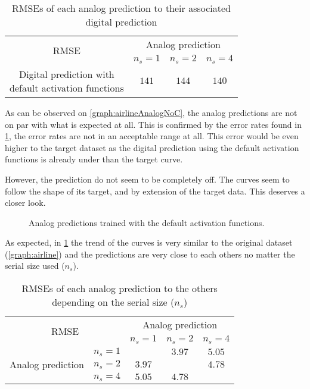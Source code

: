 \begin{table}[H]
  \centering
  \begin{tabular}{|c|c|c|c|}
    \hline
    \multirow{2}{*}{\acs{RMSE}} & \multicolumn{3}{c|}{Analog prediction}\\
    \cline{2-4}
    & $n_s=1$ & $n_s=2$ & $n_s=4$ \\
    \hline
    \specialcell{Digital prediction with\\default activation functions} & $141$ & $144$ & $140$\\
    \hline
  \end{tabular}
  \caption{\acp{RMSE} of each analog prediction to their associated digital prediction}
  \label{tab:airlineAnalogNoC}
\end{table}

As can be observed on \cref{graph:airlineAnalogNoC}, the analog predictions are not on par with what is expected at all. This is confirmed by the error rates found in \cref{tab:airlineAnalogNoC}, the error rates are not in an acceptable range at all. This error would be even higher to the target dataset as the digital prediction using the default activation functions is already under than the target curve.

However, the prediction do not seem to be completely off. The curves seem to follow the shape of its target, and by extension of the target data. This deserves a closer look.

\begin{figure}[H]
  \centering
  
  \caption{Analog predictions trained with the default activation functions.}
  \label{graph:airlineAnalogNoCZoomed}
\end{figure}

As expected, in \cref{graph:airlineAnalogNoCZoomed} the trend of the curves is very similar to the original dataset (\cref{graph:airline}) and the predictions are very close to each others no matter the serial size used ($n_s$).

\begin{table}[H]
  \centering
  \begin{tabular}{|c|c|c|c|c|}
    \hline
    \multicolumn{2}{|c}{\multirow{2}{*}{\ac{RMSE}}} & \multicolumn{3}{|c|}{Analog prediction}\\
    \cline{3-5}
    \multicolumn{2}{|c}{} & \multicolumn{1}{|c|}{$n_s=1$} & $n_s=2$ & $n_s=4$ \\
    \hline
    \multirow{3}{*}{Analog prediction} & $n_s=1$ &\cellcolor[HTML]{202020} & $3.97$ & $5.05$\\
    \cline{2-5}
    & $n_s=2$  & $3.97$ & \cellcolor[HTML]{202020} & $4.78$\\
    \cline{2-5}
    & $n_s=4$ & $5.05$ & $4.78$ & \cellcolor[HTML]{202020}\\
    \hline
  \end{tabular}
  \caption{\acp{RMSE} of each analog prediction to the others depending on the serial size ($n_s$)}
  \label{tab:airlineAnalogNoCZoomed}
\end{table}

